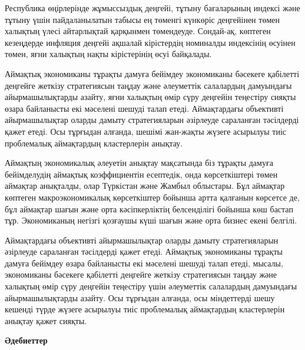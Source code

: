 \begin{multicols}{2}
Республика өңірлерінде жұмыссыздық деңгейі, тұтыну бағаларының индексі
және тұтыну үшін пайдаланылатын табысы ең төменгі күнкөріс деңгейінен
төмен халықтың үлесі айтарлықтай қарқынмен төмендеуде. Сондай-ақ,
көптеген кезеңдерде инфляция деңгейі ақшалай кірістердің номиналды
индексінің өсуінен төмен, яғни халықтың нақты кірістерінің өсуі
байқалады.

Аймақтық экономиканы тұрақты дамуға бейімдеу экономиканы бәсекеге
қабілетті деңгейге жеткізу стратегиясын таңдау және әлеуметтік
салалардың дамуындағы айырмашылықтарды азайту, яғни халықтың өмір сүру
деңгейін теңестіру сияқты өзара байланысты екі мәселені шешуді талап
етеді. Аймақтардағы объективті айырмашылықтар оларды дамыту
стратегияларын әзірлеуде сараланған тәсілдерді қажет етеді. Осы тұрғыдан
алғанда, шешімі жан-жақты жүзеге асырылуы тиіс проблемалық аймақтардың
кластерлерін анықтау.

Аймақтың экономикалық әлеуетін анықтау мақсатында біз тұрақты дамуға
бейімделудің аймақтық коэффициентін есептедік, онда көрсеткіштері төмен
аймақтар анықталды, олар Түркістан және Жамбыл облыстары. Бұл аймақтар
көптеген макроэкономикалық көрсеткіштер бойынша артта қалғанын көрсетсе
де, бұл аймақтар шағын және орта кәсіпкерліктің белсенділігі бойынша көш
бастап тұр. Экономиканың негізгі қозғаушы күші шағын және орта бизнес
екені белгілі.

Аймақтардағы объективті айырмашылықтар оларды дамыту стратегияларын
әзірлеуде сараланған тәсілдерді қажет етеді. Аймақтық экономиканы
тұрақты дамуға бейімдеу өзара байланысты екі мәселені шешуді талап
етеді, мысалы, экономиканы бәсекеге қабілетті деңгейге жеткізу
стратегиясын таңдау және халықтың өмір сүру деңгейін теңестіру үшін
әлеуметтік салалардың дамуындағы айырмашылықтарды азайту. Осы тұрғыдан
алғанда, осы міндеттерді шешу кешенді түрде жүзеге асырылуы тиіс
проблемалық аймақтардың кластерлерін анықтау қажет сияқты.
\end{multicols}

\begin{center}
{\bfseries Әдебиеттер}
\end{center}

